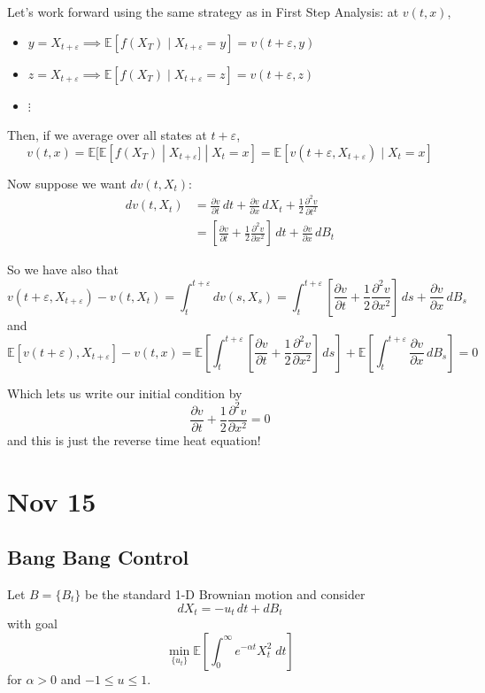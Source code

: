 \documentclass[12pt]{report}
\newcommand{\E}{\mathbb{E}}
\newcommand{\ep}{\varepsilon}
\begin{document}
    Let's work forward using the same strategy as in First Step Analysis: at $v(t, x)$, 
    \begin{itemize}
        \item $y = X_{t+\ep} \implies \E[f(X_T) \; | \; X_{t+\ep} = y] = v(t+\ep, y)$
        \item $z = X_{t +\ep} \implies \E[f(X_T) \; | \; X_{t+\ep} = z] = v(t+\ep, z)$
        \item $\vdots$
    \end{itemize}

    Then, if we average over all states at $t + \ep$, 
    \[v(t,x) = \E[\E[f(X_T) \; | \; X_{t+\ep}] \; | \; X_t = x] = \E[v(t+ \ep, X_{t+\ep}) \; | \; X_t = x]\]

    Now suppose we want $dv(t, X_t)$:
    \begin{align*}
        dv(t, X_t) &= \frac{\partial v}{\partial t}\, dt + \frac{\partial v}{\partial x}\, dX_t  + \frac{1}{2}\frac{\partial^2 v}{\partial t^2}\\ 
        &= \left[\frac{\partial v}{\partial t} + \frac{1}{2}\frac{\partial^2 v}{\partial x^2}\right] \, dt + \frac{\partial v}{\partial x}\, dB_t
    \end{align*}

    So we have also that 
    \[v(t + \ep, X_{t+\ep})- v(t, X_t) = \int_t^{t+\ep} dv(s, X_s) = \int_t^{t+\ep} \left[\frac{\partial v}{\partial t} + \frac{1}{2}\frac{\partial^2 v}{\partial x^2}\right] \, ds + \frac{\partial v}{\partial x}\, dB_s\]
    and 
    \[\E[v(t+\ep), X_{t+\ep}] - v(t,x) = \E\left[\int_t^{t+\ep} \left[\frac{\partial v}{\partial t} + \frac{1}{2}\frac{\partial^2 v}{\partial x^2}\right] \, ds\right] + \E\left[\int_t^{t+\ep} \frac{\partial v}{\partial x}\, dB_s\right] = 0\]

    Which lets us write our initial condition by  
    \[\frac{\partial v}{\partial t} + \frac{1}{2}\frac{\partial^2 v}{\partial x^2} = 0\]
    and this is just the reverse time heat equation! 

\section{Nov 15}
\subsection{Bang Bang Control}
    Let $B = \{B_t\}$ be the standard 1-D Brownian motion and consider 
    \[dX_t = -u_t \, dt + dB_t\]
    with goal 
    \[\min_{\{u_t\}} \E\left[\int_0^{\infty} e^{-\alpha t} X_t^2 \; dt\right]\]
    for $\alpha > 0$ and $-1 \leq u \leq 1$.
\end{document}
